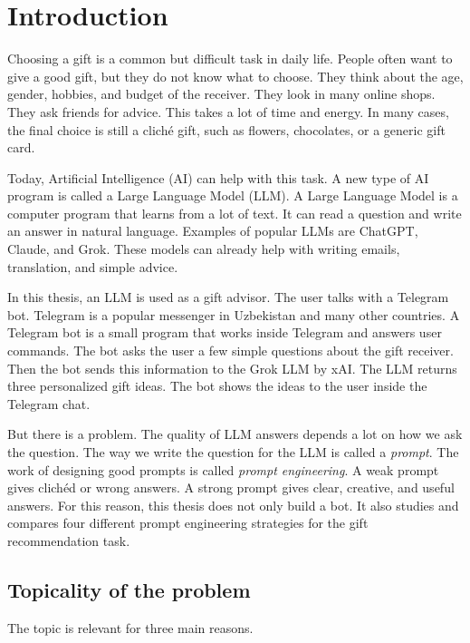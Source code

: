 \chapter*{Introduction}
\label{ch:introduction}

Choosing a gift is a common but difficult task in daily life. People often want to give a good gift, but they do not know what to choose. They think about the age, gender, hobbies, and budget of the receiver. They look in many online shops. They ask friends for advice. This takes a lot of time and energy. In many cases, the final choice is still a cliché gift, such as flowers, chocolates, or a generic gift card.

Today, Artificial Intelligence (AI) can help with this task. A new type of AI program is called a Large Language Model (LLM). A Large Language Model is a computer program that learns from a lot of text. It can read a question and write an answer in natural language. Examples of popular LLMs are ChatGPT, Claude, and Grok. These models can already help with writing emails, translation, and simple advice.

In this thesis, an LLM is used as a gift advisor. The user talks with a Telegram bot. Telegram is a popular messenger in Uzbekistan and many other countries. A Telegram bot is a small program that works inside Telegram and answers user commands. The bot asks the user a few simple questions about the gift receiver. Then the bot sends this information to the Grok LLM by xAI. The LLM returns three personalized gift ideas. The bot shows the ideas to the user inside the Telegram chat.

But there is a problem. The quality of LLM answers depends a lot on how we ask the question. The way we write the question for the LLM is called a \textit{prompt}. The work of designing good prompts is called \textit{prompt engineering}. A weak prompt gives clichéd or wrong answers. A strong prompt gives clear, creative, and useful answers. For this reason, this thesis does not only build a bot. It also studies and compares four different prompt engineering strategies for the gift recommendation task.

\section*{Topicality of the problem}

The topic is relevant for three main reasons.

